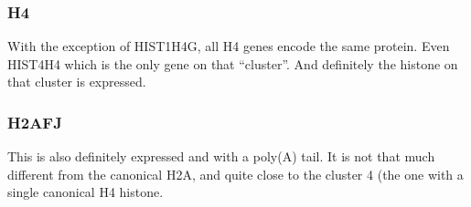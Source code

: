     \subsubsection{H4}
      With the exception of HIST1H4G, all H4 genes encode the same protein.
      Even HIST4H4 which is the only gene on that ``cluster''. And definitely
      the histone on that cluster is expressed.

    \subsubsection{H2AFJ}
      This is also definitely expressed \citep{h2afj-report} and with a
      poly(A) tail. It is not that much different from the canonical
      H2A, and quite close to the cluster 4 (the one with a single
      canonical H4 histone.

